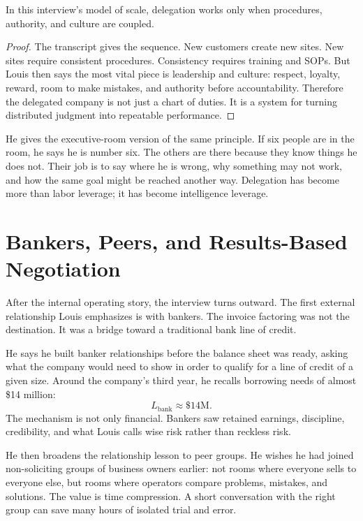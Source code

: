 \begin{proposition}
In this interview's model of scale, delegation works only when procedures, authority, and culture are coupled.
\end{proposition}

\begin{proof}
The transcript gives the sequence. New customers create new sites. New sites require consistent procedures. Consistency requires training and SOPs. But Louis then says the most vital piece is leadership and culture: respect, loyalty, reward, room to make mistakes, and authority before accountability. Therefore the delegated company is not just a chart of duties. It is a system for turning distributed judgment into repeatable performance.
\end{proof}

He gives the executive-room version of the same principle. If six people are in the room, he says he is number six. The others are there because they know things he does not. Their job is to say where he is wrong, why something may not work, and how the same goal might be reached another way. Delegation has become more than labor leverage; it has become intelligence leverage.

\section{Bankers, Peers, and Results-Based Negotiation}

After the internal operating story, the interview turns outward. The first external relationship Louis emphasizes is with bankers. The invoice factoring was not the destination. It was a bridge toward a traditional bank line of credit.

He says he built banker relationships before the balance sheet was ready, asking what the company would need to show in order to qualify for a line of credit of a given size. Around the company's third year, he recalls borrowing needs of almost \$14 million:
\begin{equation}
L_{\mathrm{bank}} \approx \$14\text{M}.
\end{equation}
The mechanism is not only financial. Bankers saw retained earnings, discipline, credibility, and what Louis calls wise risk rather than reckless risk.

He then broadens the relationship lesson to peer groups. He wishes he had joined non-soliciting groups of business owners earlier: not rooms where everyone sells to everyone else, but rooms where operators compare problems, mistakes, and solutions. The value is time compression. A short conversation with the right group can save many hours of isolated trial and error.

